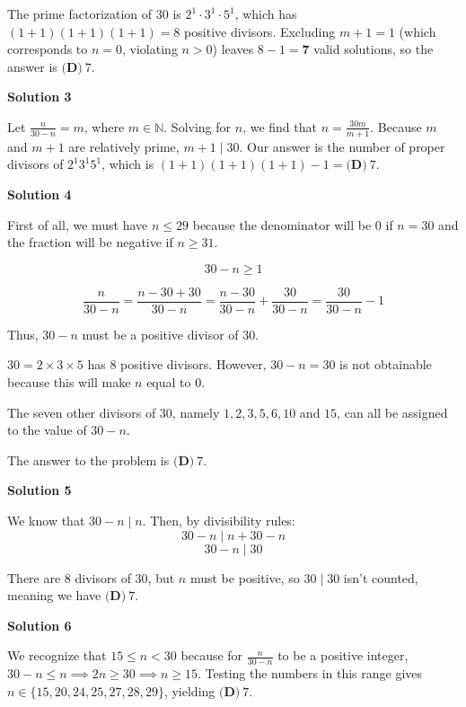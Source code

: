 \begin{enumerate}
 The prime factorization of $30$ is $2^1 \cdot 3^1 \cdot 5^1$, which has $(1 + 1)(1 + 1)(1 + 1) = 8$ positive divisors. Excluding $m + 1 = 1$ (which corresponds to $n = 0$, violating $n > 0$) leaves $8 - 1 = \mathbf{7}$ valid solutions, so the answer is $\boxed{\textbf{(D)}\ 7}$.

 



\textbf{Solution 3}

Let $\frac{n}{30-n} = m$, where $m\in\mathbb{N}$. Solving for $n$, we find that $n=\frac{30m}{m+1}$. Because $m$ and $m+1$ are relatively prime, $m+1\mid 30$. Our answer is the number of proper divisors of $2^1 3^1 5^1$, which is $(1+1)(1+1)(1+1)-1=\boxed{\textbf{(D)}\ 7}$.

 



\textbf{Solution 4}

First of all, we must have $n\leq{29}$ because the denominator will be $0$ if $n=30$ and the fraction will be negative if $n\geq{31}$.

 
 \[30-n\geq{1}\]

 \[\frac{n}{30-n} = \frac{n-30+30}{30-n} = \frac{n-30}{30-n}+\frac{30}{30-n} = \frac{30}{30-n}-1\]

 Thus, $30-n$ must be a positive divisor of $30$.

 $30=2\times 3\times 5$ has $8$ positive divisors. However, $30-n=30$ is not obtainable because this will make $n$ equal to $0$.

 The seven other divisors of $30$, namely $1,2,3,5,6,10$ and $15$, can all be assigned to the value of $30-n$.

 The answer to the problem is $\boxed{\textbf{(D)}\ 7}$.

 



\textbf{Solution 5}

We know that $30-n\mid n$. Then, by divisibility rules:
 \[30-n\mid n+30-n\]
 \[30-n\mid 30\]

 There are $8$ divisors of $30$, but $n$ must be positive, so $30\mid 30$ isn't counted, meaning we have $\boxed{\textbf{(D)}\ 7}$.

 



\textbf{Solution 6}

We recognize that $15\le n < 30$ because for $\frac{n}{30-n}$ to be a positive integer, $30-n \le n \implies 2n \ge 30 \implies n \ge 15$. Testing the numbers in this range gives $n \in \{15, 20, 24, 25, 27, 28, 29\}$, yielding $\boxed{\textbf{(D)}\ 7}$.


\end{enumerate}
